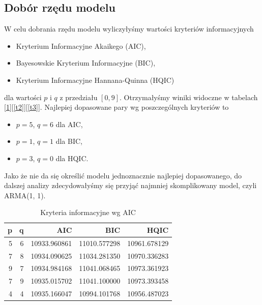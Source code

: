 \documentclass{article}
\theoremstyle{break}
\begin{document}
	\subsection{Dobór rzędu modelu}
	W celu dobrania rzędu modelu wyliczyłyśmy wartości kryteriów informacyjnych
	\begin{itemize}
		\item Kryterium Informacyjne Akaikego (AIC),
		\item Bayesowskie Kryterium Informacyjne (BIC),
		\item Kryterium Informacyjne Hannana-Quinna (HQIC)
	\end{itemize}
	
	dla wartości $p$ i $q$ z przedziału $[0,9]$. Otrzymałyśmy winiki widoczne w tabelach [\ref{t1}][\ref{t2}][\ref{t3}]. Najlepiej dopasowane pary wg poszczególnych kryteriów to
	
	\begin{itemize}
		\item $p=5$, $q=6$ dla AIC,
		\item $p=1$, $q=1$ dla BIC,
		\item $p=3$, $q=0$ dla HQIC.
	\end{itemize}
	
	Jako że nie da się określić modelu jednoznacznie najlepiej dopasowanego, do dalszej analizy zdecydowałyśmy się przyjąć najmniej skomplikowany model, czyli ARMA(1, 1).
	
	\begin{table}[H]
		\centering
		\begin{tabular}{|r|r|r|r|r|}
			\hline
			\rowcolor[HTML]{C0C0C0} 
			{\color[HTML]{343434} \textbf{p}} & {\color[HTML]{343434} \textbf{q}} & {\color[HTML]{343434} \textbf{AIC}} & {\color[HTML]{343434} \textbf{BIC}} & {\color[HTML]{343434} \textbf{HQIC}} \\ \hline
			{\color[HTML]{343434} 5}          & {\color[HTML]{343434} 6}          & {\color[HTML]{343434} 10933.960861} & {\color[HTML]{343434} 11010.577298} & {\color[HTML]{343434} 10961.678129}  \\ \hline
			{\color[HTML]{343434} 7}          & {\color[HTML]{343434} 8}          & {\color[HTML]{343434} 10934.090625} & {\color[HTML]{343434} 11034.281350} & {\color[HTML]{343434} 10970.336283}  \\ \hline
			{\color[HTML]{343434} 9}          & {\color[HTML]{343434} 7}          & {\color[HTML]{343434} 10934.984168} & {\color[HTML]{343434} 11041.068465} & {\color[HTML]{343434} 10973.361923}  \\ \hline
			{\color[HTML]{343434} 7}          & {\color[HTML]{343434} 9}          & {\color[HTML]{343434} 10935.015702} & {\color[HTML]{343434} 11041.100000} & {\color[HTML]{343434} 10973.393458}  \\ \hline
			{\color[HTML]{343434} 4}          & {\color[HTML]{343434} 4}          & {\color[HTML]{343434} 10935.166047} & {\color[HTML]{343434} 10994.101768} & {\color[HTML]{343434} 10956.487023}  \\ \hline
		\end{tabular}
		\caption{Kryteria informacyjne wg AIC}
		\label{t1}
	\end{table}
	
\end{document}

